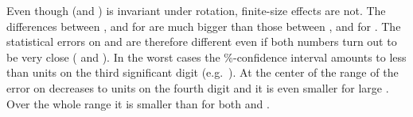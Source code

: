 \documentclass[a4paper,12pt]{article}
\begin{document}
Even though \coordHE{} (and \coordHE{}) is invariant under rotation,
finite-size effects are not. The differences between 
\coordHE{},
\coordHE{} and
\coordHE{}
for \coordHE{} are much bigger than those between 
\coordHE{},
\coordHE{} and
\coordHE{}
for \coordHE{}. The statistical errors on \coordHE{}
and \coordHE{} are therefore different even if both numbers
turn out to be very close (\coordHE{} and \coordHE{}). In the worst
cases the \coordHE{}\%-confidence interval amounts to less than \coordHE{} units
on the third significant digit (e.g.\ \coordHE{}). At the center of the range of \coordHE{} the error on \coordHE{}
decreases to \coordHE{} units on the fourth digit and it is even smaller for 
large \coordHE{}. Over the whole range it is smaller than \coordHE{}
for both \coordHE{} and \coordHE{}.
\end{document}
